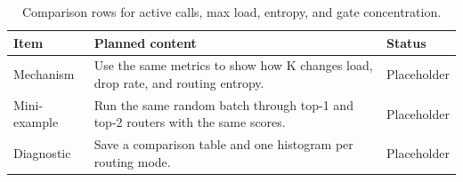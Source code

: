 \begin{table}[H]
\centering
\caption{Comparison rows for active calls, max load, entropy, and gate concentration.}
\label{tab:ch05-comparing-top-1-and-top-2-diagnostics}
\begin{tabularx}{\textwidth}{p{}X p{}}
\toprule
Item & Planned content & Status \\
\midrule
Mechanism & Use the same metrics to show how K changes load, drop rate, and routing entropy. & Placeholder \\
Mini-example & Run the same random batch through top-1 and top-2 routers with the same scores. & Placeholder \\
Diagnostic & Save a comparison table and one histogram per routing mode. & Placeholder \\
\bottomrule
\end{tabularx}
\end{table}
